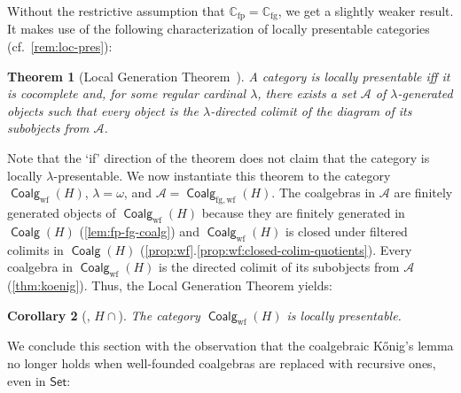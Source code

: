 \documentclass[10pt,a4paper]{article}
\newtheorem{theorem}{Theorem}[section]
\newtheorem{corollary}[theorem]{Corollary}
\theoremstyle{definition}
\theoremstyle{remark}
\numberwithin{equation}{section}
\providecommand{\catname}{\mathsf}
\def\Set{\catname{Set}}
\newcommand{\Konig}{Kőnig}
\providecommand{\C}{}
\newcommand{\fp}{{\mathrm{fp}}}
\newcommand{\fg}{{\mathrm{fg}}}
\newcommand{\wf}{{\mathrm{wf}}}
\renewcommand{\C}{{\mathbb{C}}}
\newcommand{\A}{\mathcal{A}}
\newcommand{\iref}[2]{\autoref{#1}.\ref{#1:#2}}
\DeclareMathOperator{\Coalg}{\mathsf{Coalg}}
\newcommand{\injmono}{\ensuremath{\overset{\smash{\raisebox{-1pt}{\ensuremath{\scriptstyle+}}}}{\rightarrowtail}}}\newcommand{\hpresint}{\ensuremath{H\cap}\xspace}
\theoremstyle{plain}
\theoremstyle{definition}
\begin{document}
Without the restrictive assumption that $\C_\fp=\C_\fg$, we get a slightly weaker result. It makes use of the following characterization of locally presentable categories (cf.\ \autoref{rem:loc-pres}):

\begin{theorem}[{Local Generation Theorem~\cite[Thm.~1.70]{adamek_rosicky_1994}}] A category is locally presentable iff it is cocomplete and, for some regular cardinal $\lambda$, there exists a set $\mathcal{A}$ of $\lambda$-generated objects such that every object is the $\lambda$-directed colimit of the diagram of its subobjects from $\mathcal{A}$. 
\end{theorem}

Note that the `if' direction of the theorem does not claim that the category is locally $\lambda$-presentable. We now instantiate this theorem to the category $\Coalg_\wf(H)$, $\lambda=\omega$, and $\mathcal{A}=\Coalg_{\fg,\wf}(H)$. The coalgebras in $\A$ are finitely generated objects of $\Coalg_\wf(H)$ because they are finitely generated in $\Coalg(H)$ (\autoref{lem:fp-fg-coalg}) and  $\Coalg_\wf(H)$ is closed under filtered colimits in $\Coalg(H)$ (\iref{prop:wf}{closed-colim-quotients}). Every coalgebra in $\Coalg_\wf(H)$ is the directed colimit of its subobjects from $\A$ (\autoref{thm:koenig}). Thus, the Local Generation Theorem yields:

\begin{corollary}[\smash{\injmono}, \hpresint]
The category $\Coalg_\wf(H)$ is locally presentable.
\end{corollary}
We conclude this section with the observation that the coalgebraic \Konig's lemma no longer holds when well-founded coalgebras are replaced with recursive ones, even in $\Set$:
\end{document}
